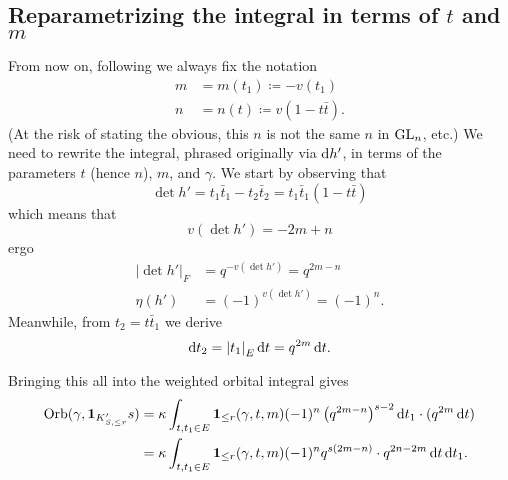 \subsection{Reparametrizing the integral in terms of $t$ and $m$}
From now on, following \cite[\S4]{ref:AFL} we always fix the notation
\begin{align*}
  m &= m(t_1) \coloneqq -v(t_1) \\
  n &= n(t) \coloneqq v(1-t\bar t).
\end{align*}
(At the risk of stating the obvious, this $n$ is not the same $n$ in $\operatorname{GL}_n$, etc.)
We need to rewrite the integral, phrased originally via $\odif{h'}$,
in terms of the parameters $t$ (hence $n$), $m$, and $\gamma$.
We start by observing that
\[ \det h' = t_1 \bar t_1 - t_2 \bar t_2 = t_1 \bar t_1 (1 - t\bar t) \]
which means that
\[ v(\det h') = -2m + n \]
ergo
\begin{align*}
\left\lvert \det h' \right\rvert_F &= q^{-v(\det h')} = q^{2m-n} \\
\eta(h') &= (-1)^{v(\det h')} = (-1)^n.
\end{align*}
Meanwhile, from $t_2 = t \bar t_1$ we derive
\[ \odif t_2 = \left\lvert t_1 \right\rvert_E \odif t = q^{2m} \odif t. \]

Bringing this all into the weighted orbital integral gives
\begin{align*}
  \Orb(\gamma, \mathbf{1}_{K'_{S, \le r}} s)
  &= \kappa \int_{t, t_1 \in E} \mathbf{1}_{\le r}(\gamma, t, m)
  (-1)^n \left( q^{2m-n} \right)^{s-2} \odif t_1 \cdot (q^{2m} \odif t) \\
  &= \kappa \int_{t, t_1 \in E} \mathbf{1}_{\le r}(\gamma, t, m)
  (-1)^n q^{s(2m-n)} \cdot q^{2n-2m} \odif t \odif t_1.
\end{align*}

